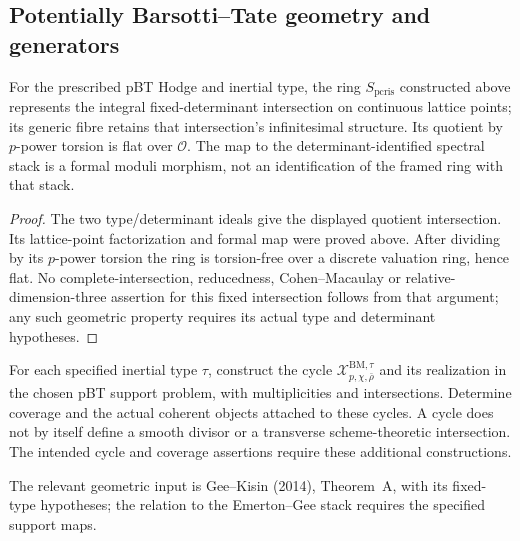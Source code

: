 \subsection{Potentially Barsotti--Tate geometry and generators}
\begin{lemma}
\label{v4-arith:w6-e:lem:Kisin-pBT}
For the prescribed pBT Hodge and inertial type, the ring $S_{\mathrm{pcris}}$
constructed above represents the integral fixed-determinant intersection
on continuous lattice points; its generic fibre retains that
intersection's infinitesimal structure. Its quotient by $p$-power
torsion is flat over $\mathcal O$. The map to the determinant-identified
spectral stack is a formal moduli morphism, not an identification
of the framed ring with that stack.
\end{lemma}
\begin{proof}
The two type/determinant ideals give the displayed quotient intersection.
Its lattice-point factorization and formal map were proved above.
After dividing by its $p$-power torsion the ring is torsion-free over
a discrete valuation ring, hence flat. No complete-intersection,
reducedness, Cohen--Macaulay or relative-dimension-three assertion
for this fixed intersection follows from that argument; any such
geometric property requires its actual type and determinant hypotheses.
\end{proof}

\begin{conjecture}
\label{v4-arith:w6-e:lem:GK-BM-pBT}
For each specified inertial type $\tau$, construct the cycle
$\mathcal X^{\mathrm{BM},\tau}_{p,\chi,\bar\rho}$ and its realization
in the chosen pBT support problem, with multiplicities and
intersections. Determine coverage and the actual coherent objects
attached to these cycles. A cycle does not by itself define a smooth
divisor or a transverse scheme-theoretic intersection. The intended
cycle and coverage assertions require these additional constructions.
\end{conjecture}
The relevant geometric input is Gee--Kisin (2014), Theorem~A, with
its fixed-type hypotheses; the relation to the Emerton--Gee stack
requires the specified support maps.


